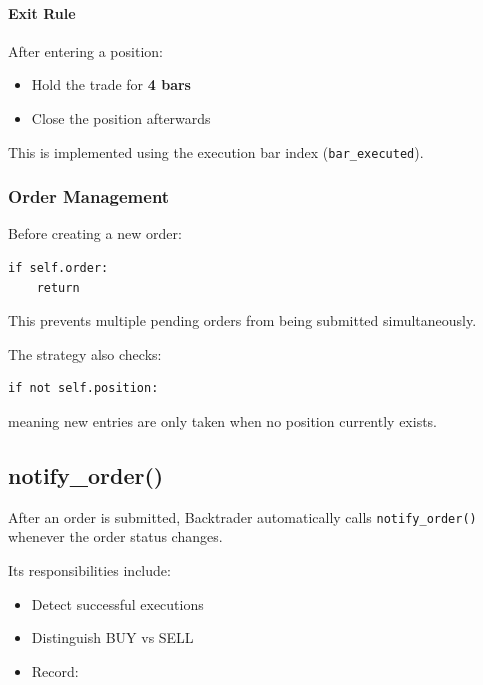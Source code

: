 \documentclass[12pt,openany]{book}
\begin{document}
\paragraph{Exit Rule}

After entering a position:

\begin{itemize}[leftmargin=*]
    \item Hold the trade for \textbf{4 bars}
    \item Close the position afterwards
\end{itemize}

This is implemented using the execution bar index (\texttt{bar\_executed}).

\subsubsection{Order Management}

Before creating a new order:

\begin{Verbatim}[breaklines=true,breakanywhere=true,fontsize=\small]
if self.order:
    return
\end{Verbatim}

This prevents multiple pending orders from being submitted simultaneously.

The strategy also checks:

\begin{Verbatim}[breaklines=true,breakanywhere=true,fontsize=\small]
if not self.position:
\end{Verbatim}

meaning new entries are only taken when no position currently exists.

\subsection{notify\_order()}

After an order is submitted, Backtrader automatically calls \texttt{notify\_order()} whenever the order status changes.

Its responsibilities include:

\begin{itemize}[leftmargin=*]
    \item Detect successful executions
    \item Distinguish BUY vs SELL
    \item Record:
\end{itemize}
\end{document}
